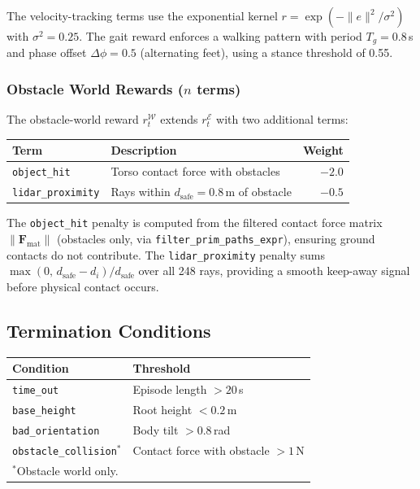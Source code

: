 \documentclass{article}
\begin{document}
The velocity-tracking terms use the exponential kernel
$r = \exp(-\|e\|^2 / \sigma^2)$ with $\sigma^2 = 0.25$.
The gait reward enforces a walking pattern with period $T_g = 0.8$\,s and
phase offset $\Delta\phi = 0.5$ (alternating feet), using a stance threshold
of 0.55.

\subsubsection{Obstacle World Rewards ($n$ terms)}

The obstacle-world reward $r_t^\mathcal{W}$ extends $r_t^\mathcal{E}$ with
two additional terms:

\begin{center}
\begin{tabular}{llr}
  \toprule
  \textbf{Term} & \textbf{Description} & \textbf{Weight} \\
  \midrule
  \texttt{object\_hit} & Torso contact force with obstacles & $-2.0$ \\
  \texttt{lidar\_proximity} & Rays within $d_\text{safe}{=}0.8$\,m of obstacle & $-0.5$ \\
  \bottomrule
\end{tabular}
\end{center}

The \texttt{object\_hit} penalty is computed from the filtered contact force
matrix $\|\mathbf{F}_\text{mat}\|$ (obstacles only, via
\texttt{filter\_prim\_paths\_expr}), ensuring ground contacts do not
contribute.
The \texttt{lidar\_proximity} penalty sums
$\max(0,\, d_\text{safe} - d_i) / d_\text{safe}$ over all 248 rays,
providing a smooth keep-away signal before physical contact occurs.

\subsection{Termination Conditions}

\begin{center}
\begin{tabular}{ll}
  \toprule
  \textbf{Condition} & \textbf{Threshold} \\
  \midrule
  \texttt{time\_out} & Episode length $> 20$\,s \\
  \texttt{base\_height} & Root height $< 0.2$\,m \\
  \texttt{bad\_orientation} & Body tilt $> 0.8$\,rad \\
  \texttt{obstacle\_collision}$^*$ & Contact force with obstacle $> 1$\,N \\
  \bottomrule
  \multicolumn{2}{l}{$^*$Obstacle world only.}
\end{tabular}
\end{center}
\end{document}
